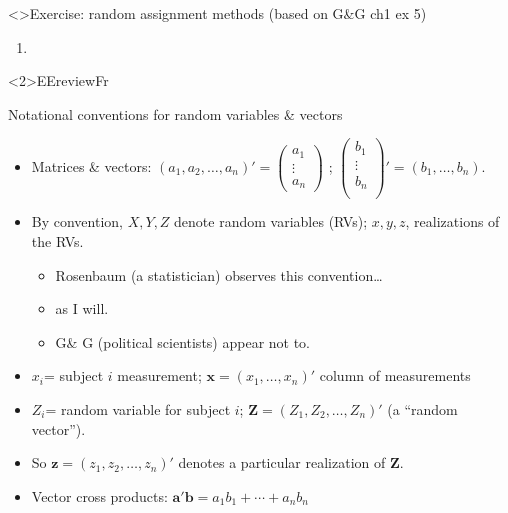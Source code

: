\begin{frame}<\nottheirhandout>{Exercise: random assignment methods}
{\footnotesize (based on G\&G ch1 ex 5)}

\begin{enumerate} \addtocounter{enumi}{8}
\item

\end{enumerate}

\end{frame}

\againframe<2\mynoteonly>{EEreviewFr}




\begin{frame}{Notational conventions for random variables \& vectors}
  
  \begin{itemize}
\item Matrices \& vectors: $(a_{1}, a_{2}, \ldots, a_{n})' = \left(
    \begin{array}{c}
      a_{1} \\ \vdots \\ a_{n}
    \end{array}
\right)$ ;  $\left(
      \begin{array}{c}
        b_{1} \\  \vdots \\ b_{n}\\
      \end{array}
\right)' = (b_{1}, \ldots, b_{n})$.
  \item By convention, $X, Y, Z$ denote random variables (RVs); $x, y, z$, realizations of the RVs.
    \begin{itemize}
    \item Rosenbaum (a statistician) observes this convention\ldots
    \item as I will.
    \item G\& G (political scientists) appear not to.
    \end{itemize}
 \item $x_{i}$= subject $i$ measurement; $\mathbf{x} =(x_{1}, \ldots, x_{n})'$ column of measurements
  \item $Z_i$= random variable for subject $i$; $\mathbf{Z}=(Z_1, Z_2,
    \ldots, Z_n)'$ (a ``random vector'').  
  \item So $\mathbf{z}=(z_1, z_2, \ldots, z_n)'$ denotes a particular
    realization of $\mathbf{Z} $.
  \item Vector cross products: $\mathbf{a}'\mathbf{b}  = a_{1}b_{1} + \cdots + a_{n}b_{n}$
  \end{itemize}


\end{frame}

